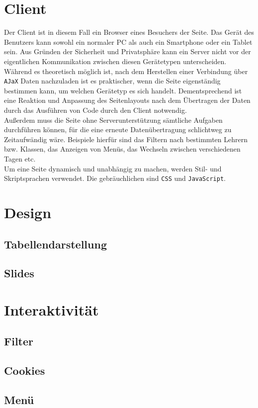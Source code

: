 \section{Client}
Der Client ist in diesem Fall ein Browser eines Besuchers der Seite. Das Gerät des Benutzers kann sowohl ein normaler PC als auch ein Smartphone oder ein Tablet sein. Aus Gründen der Sicherheit und Privatsphäre kann ein Server nicht vor der eigentlichen Kommunikation zwischen diesen Gerätetypen unterscheiden. Während es theoretisch möglich ist, nach dem Herstellen einer Verbindung über \texttt{AJaX} Daten nachzuladen ist es praktischer, wenn die Seite eigenständig bestimmen kann, um welchen Gerätetyp es sich handelt. Dementsprechend ist eine Reaktion und Anpassung des Seitenlayouts nach dem Übertragen der Daten durch das Ausführen von Code durch den Client notwendig.\\

Außerdem muss die Seite ohne Serverunterstützung sämtliche Aufgaben durchführen können, für die eine erneute Datenübertragung schlichtweg zu Zeitaufwändig wäre. Beispiele hierfür sind das Filtern nach bestimmten Lehrern bzw. Klassen, das Anzeigen von Menüs, das Wechseln zwischen verschiedenen Tagen etc.\\

Um eine Seite dynamisch und unabhängig zu machen, werden Stil- und Skriptsprachen verwendet. Die gebräuchlichen sind \texttt{CSS} und \texttt{JavaScript}.

\section{Design}
\subsection{Tabellendarstellung}
%
\subsection{Slides}
%


\section{Interaktivität}
\subsection{Filter}
%
\subsection{Cookies}
%
\subsection{Menü}
%

